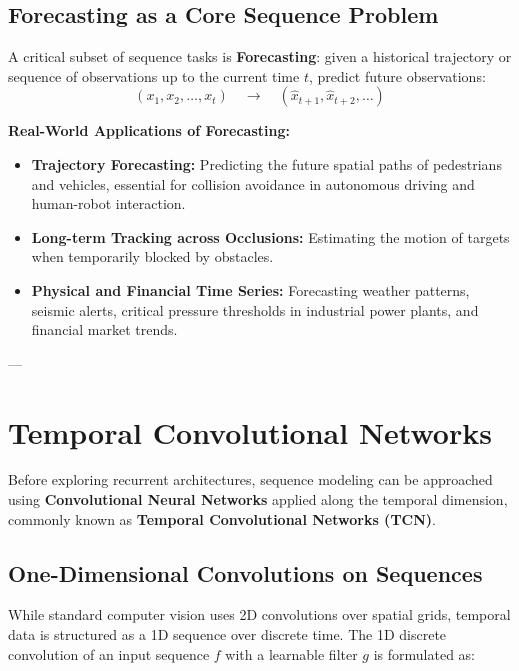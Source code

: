 \subsection{Forecasting as a Core Sequence Problem}

A critical subset of sequence tasks is \textbf{Forecasting}: given a historical trajectory or sequence of observations up to the current time $t$, predict future observations:
\[ (x_1, x_2, \dots, x_t) \quad \longrightarrow \quad (\hat{x}_{t+1}, \hat{x}_{t+2}, \dots) \]

\begin{examplebox}
\textbf{Real-World Applications of Forecasting:}
\begin{itemize}[nosep, leftmargin=*]
    \item \textbf{Trajectory Forecasting:} Predicting the future spatial paths of pedestrians and vehicles, essential for collision avoidance in autonomous driving and human-robot interaction.
    \item \textbf{Long-term Tracking across Occlusions:} Estimating the motion of targets when temporarily blocked by obstacles.
    \item \textbf{Physical and Financial Time Series:} Forecasting weather patterns, seismic alerts, critical pressure thresholds in industrial power plants, and financial market trends.
\end{itemize}
\end{examplebox}

---

\section{Temporal Convolutional Networks}

Before exploring recurrent architectures, sequence modeling can be approached using \textbf{Convolutional Neural Networks} applied along the temporal dimension, commonly known as \textbf{Temporal Convolutional Networks (TCN)}.

\subsection{One-Dimensional Convolutions on Sequences}

While standard computer vision uses 2D convolutions over spatial grids, temporal data is structured as a 1D sequence over discrete time. The 1D discrete convolution of an input sequence $f$ with a learnable filter $g$ is formulated as:

